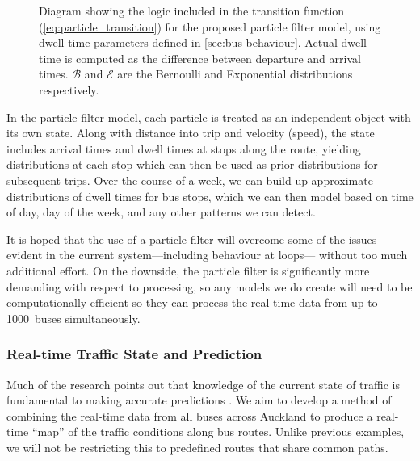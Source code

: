 \documentclass[12pt,a4paper]{article}
\newcommand{\pf}{particle filter}
\begin{document}
\begin{figure}[b!]
  \caption{Diagram showing the logic included in the transition function (\vref{eq:particle_transition}) 
    for the proposed particle filter model, 
    using dwell time parameters defined in \cref{sec:bus-behaviour}.
    Actual dwell time is computed as the difference between departure and arrival times.
    $\mathcal{B}$ and $\mathcal{E}$ are the Bernoulli and Exponential distributions respectively.}
  \label{fig:pf_logic}
\end{figure}

In the particle filter model,
each particle is treated as an independent object with its own state.
Along with distance into trip and velocity (speed),
the state includes arrival times and dwell times at stops along the route,
yielding distributions at each stop which can then be used
as prior distributions for subsequent trips.
Over the course of a week, 
we can build up approximate distributions of dwell times for bus stops,
which we can then model based on time of day, day of the week,
and any other patterns we can detect.


It is hoped that the use of a \pf{} will overcome some of the issues
evident in the current system---including behaviour at loops---%
without too much additional effort.
On the downside, the \pf{} is significantly more demanding with respect to processing, 
so any models we do create will need to be computationally efficient
so they can process the real-time data from up to 1000~buses simultaneously.



\subsubsection*{Real-time Traffic State and Prediction}

Much of the research points out that knowledge of the current state of traffic
is fundamental to making accurate predictions \citep{yu-etal:2010,yu-etal:2011}.
We aim to develop a method of combining the real-time data from
all buses across Auckland
to produce a real-time ``map'' of the traffic conditions along bus routes.
Unlike previous examples,
we will not be restricting this to predefined routes that share common paths.
\end{document}
